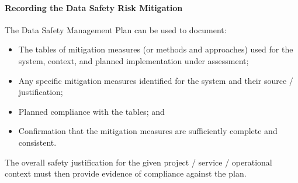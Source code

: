 \paragraph{Recording the Data Safety Risk Mitigation}
The Data Safety Management Plan can be used to document:
\begin{itemize}
  \item The tables of mitigation measures (or methods and approaches) used for the system, context, and planned implementation under assessment;
  \item Any specific mitigation measures identified for the system and their source / justification;
  \item Planned compliance with the tables; and
  \item Confirmation that the mitigation measures are sufficiently complete and consistent.
\end{itemize}  
The overall safety justification for the given project / service / operational context must then provide evidence of compliance against the plan.
